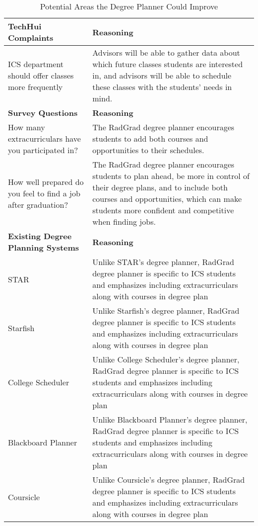 \begin{table}[htbp!]
\centering
\caption{Potential Areas the Degree Planner Could Improve}
\begin{tabular}{  |p{4cm}|p{12cm}| } 
\hline
 \textbf{TechHui Complaints} & \textbf{Reasoning} \\ 
  \hline
ICS department should offer classes more frequently & Advisors will be able to gather data about which future classes students are interested in, and advisors will be able to schedule these classes with the students' needs in mind. \\
\hline
 \textbf{Survey Questions} & \textbf{Reasoning} \\ 
  \hline
  How many extracurriculars have you participated in? & The RadGrad degree planner encourages students to add both courses and opportunities to their schedules.\\
  \hline
  How well prepared do you feel to find a job after graduation? & The RadGrad degree planner encourages students to plan ahead, be more in control of their degree plans, and to include both courses and opportunities, which can make students more confident and competitive when finding jobs.\\
  \hline
   \textbf{Existing Degree Planning Systems} & \textbf{Reasoning} \\ 
  \hline
  STAR & Unlike STAR's degree planner, RadGrad degree planner is specific to ICS students and emphasizes including extracurriculars along with courses in degree plan \\
    \hline
  Starfish & Unlike Starfish's degree planner, RadGrad degree planner is specific to ICS students and emphasizes including extracurriculars along with courses in degree plan \\
    \hline
  College Scheduler & Unlike College Scheduler's degree planner, RadGrad degree planner is specific to ICS students and emphasizes including extracurriculars along with courses in degree plan \\
    \hline
  Blackboard Planner & Unlike Blackboard Planner's degree planner, RadGrad degree planner is specific to ICS students and emphasizes including extracurriculars along with courses in degree plan \\
    \hline
  Coursicle & Unlike Coursicle's degree planner, RadGrad degree planner is specific to ICS students and emphasizes including extracurriculars along with courses in degree plan \\
  \hline
\end{tabular} 
\end{table}

